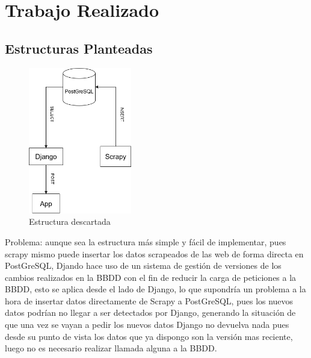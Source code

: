 \chapter[Trabajo Realizado]{Trabajo Realizado}
\label{Chap4}

\section{Estructuras Planteadas}

\begin{figure} [H]
	\centering
	\includegraphics[width=0.4\textwidth]{fig/estructura_descartada.png}
	\caption[Idea original de la estructura de datos planteada]{Estructura descartada}
	\label{fig:ej9}
\end{figure}

Problema: aunque sea la estructura más simple y fácil de implementar, pues scrapy mismo puede insertar los datos scrapeados de las web de forma directa en PostGreSQL, Djando hace uso de un sistema de gestión de versiones de los cambios realizados en la BBDD con el fin de reducir la carga de peticiones a la BBDD, esto se aplica desde el lado de Django, lo que supondría un problema a la hora de insertar datos directamente de Scrapy a PostGreSQL, pues los nuevos datos podrían no llegar a ser detectados por Django, generando la situación de que una vez se vayan a pedir los nuevos datos Django no devuelva nada pues desde su punto de vista los datos que ya dispongo son la versión mas reciente, luego no es necesario realizar llamada alguna a la BBDD.
\newline
\newline

